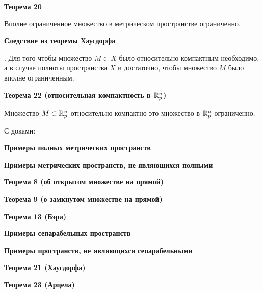 \textbf{Теорема 20}

Вполне ограниченное множество в метрическом пространстве ограниченно.

\textbf{Следствие из теоремы Хаусдорфа}

\MS. Для того чтобы множество $M \subset X$ было относительно компактным 
необходимо, а в случае полноты пространства $X$ и достаточно, чтобы множество $M$
было вполне ограниченным.

\textbf{Теорема 22 (относительная компактность в $ \mathbb{R}^n_p $) }

Множество $M \subset \mathbb{R}^n_p$ относительно компактно \tttk это множество в $\mathbb{R}^n_p$
ограниченно.


С  доками:

\textbf{Примеры полных метрических пространств  }

\textbf{Примеры метрических пространств, не являющихся полными}

\textbf{Теорема 8 (об открытом множестве на прямой) }

\textbf{Теорема 9 (о замкнутом множестве на прямой)}

\textbf{Теорема 13 (Бэра)}

\textbf{Примеры сепарабельных пространств}

\textbf{Примеры пространств, не являющихся сепарабельными}

\textbf{Теорема 21 (Хаусдорфа) }

\textbf{Теорема 23 (Арцела) }
